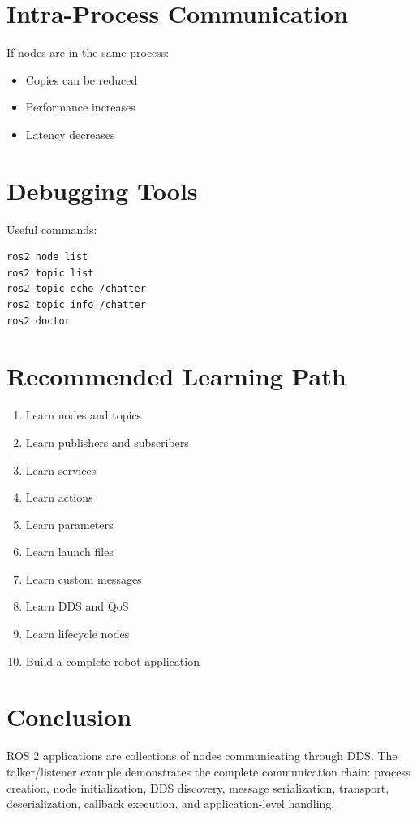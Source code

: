 \documentclass[11pt]{article}
\begin{document}
\section{Intra-Process Communication}

If nodes are in the same process:

\begin{itemize}
\item Copies can be reduced
\item Performance increases
\item Latency decreases
\end{itemize}

\section{Debugging Tools}

Useful commands:

\begin{verbatim}
ros2 node list
ros2 topic list
ros2 topic echo /chatter
ros2 topic info /chatter
ros2 doctor
\end{verbatim}

\section{Recommended Learning Path}

\begin{enumerate}
\item Learn nodes and topics
\item Learn publishers and subscribers
\item Learn services
\item Learn actions
\item Learn parameters
\item Learn launch files
\item Learn custom messages
\item Learn DDS and QoS
\item Learn lifecycle nodes
\item Build a complete robot application
\end{enumerate}

\section{Conclusion}

ROS 2 applications are collections of nodes communicating through DDS.
The talker/listener example demonstrates the complete communication chain:
process creation, node initialization, DDS discovery, message serialization,
transport, deserialization, callback execution, and application-level handling.
\end{document}
